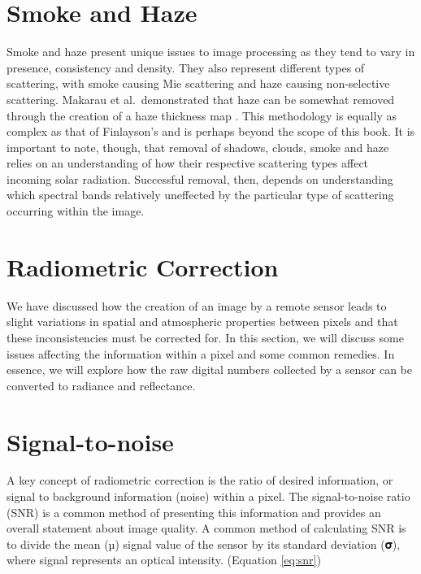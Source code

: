 \documentclass[
]{book}
\begin{document}
\hypertarget{smoke-and-haze}{%
\section{Smoke and Haze}\label{smoke-and-haze}}

Smoke and haze present unique issues to image processing as they tend to
vary in presence, consistency and density. They also represent different
types of scattering, with smoke causing Mie scattering and haze causing
non-selective scattering. Makarau et al.~demonstrated that haze
can be somewhat removed through the creation of a haze thickness map
\citep{makarau_haze_2014}. This methodology is equally as complex as that of
Finlayson's and is perhaps beyond the scope of this book. It is
important to note, though, that removal of shadows, clouds, smoke and
haze relies on an understanding of how their respective scattering types
affect incoming solar radiation. Successful removal, then, depends on
understanding which spectral bands relatively uneffected by the
particular type of scattering occurring within the image.

\hypertarget{radiometric-correction}{%
\section{Radiometric Correction}\label{radiometric-correction}}

We have discussed how the creation of an image by a remote sensor leads
to slight variations in spatial and atmospheric properties between
pixels and that these inconsistencies must be corrected for. In this
section, we will discuss some issues affecting the information within a
pixel and some common remedies. In essence, we will explore how the raw
digital numbers collected by a sensor can be converted to radiance and
reflectance.

\hypertarget{signal-to-noise}{%
\section{Signal-to-noise}\label{signal-to-noise}}

A key concept of radiometric correction is the ratio of desired
information, or signal to background information (noise) within a pixel.
The signal-to-noise ratio (SNR) is a common method of presenting this
information and provides an overall statement about image quality. A
common method of calculating SNR is to divide the mean (µ) signal value
of the sensor by its standard deviation (𝛔), where signal represents an
optical intensity. (Equation \eqref{eq:snr})
\end{document}
